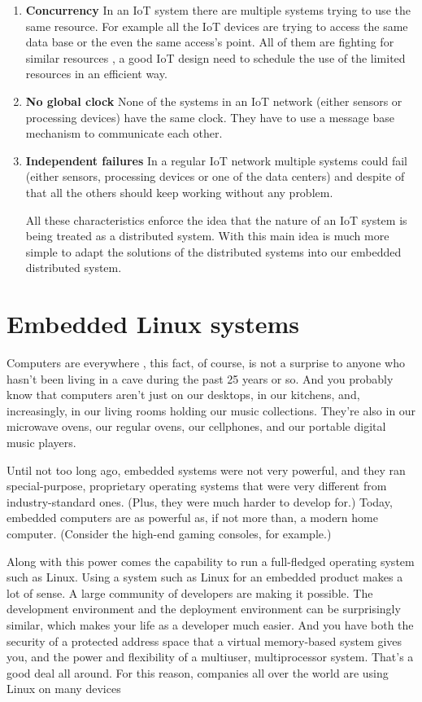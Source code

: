 \begin{enumerate}
\item \textbf{Concurrency}
In an IoT system there are multiple systems trying to use the same resource.
For example all the IoT devices are trying to access the same data base or the
even the same access's point. All of them are fighting for similar resources , a
good IoT design need to schedule the use of the limited resources in an efficient
way.

\item \textbf{No global clock}
None of the systems in an IoT network (either sensors or processing devices)
have the same clock. They have to use a message base mechanism to communicate
each other. 

\item \textbf{Independent failures}
In a regular IoT network multiple systems could fail (either sensors,
processing devices or one of the data centers) and despite of that all the
others should keep working without any problem. 

All these characteristics enforce the idea that the nature of an IoT system is
being treated as a distributed system. With this main idea is much more simple
to adapt the solutions of the distributed systems into our embedded distributed
system.

\end{enumerate}

\section{Embedded Linux systems}

Computers are everywhere , this fact, of course, is not a surprise to anyone 
who hasn't been living in a cave during the past 25 years or so. And you
probably know that computers aren't just on our desktops, in our kitchens, and, 
increasingly, in our living rooms holding our music collections. They're also 
in our microwave ovens, our regular ovens, our cellphones, and our portable 
digital music players.

Until not too long ago, embedded systems were not very powerful, and they ran
special-purpose, proprietary operating systems that were very different from
industry-standard ones. (Plus, they were much harder to develop for.) Today,
embedded computers are as powerful as, if not more than, a modern home
computer. (Consider the high-end gaming consoles, for example.)

Along with this power comes the capability to run a full-fledged operating
system such as Linux. Using a system such as Linux for an embedded product
makes a lot of sense. A large community of developers are making it possible.
The development environment and the deployment environment can be surprisingly
similar, which makes your life as a developer much easier. And you have both
the security of a protected address space that a virtual memory-based system
gives you, and the power and flexibility of a multiuser, multiprocessor system.
That's a good deal all around. For this reason, companies all over the world
are using Linux on many devices

